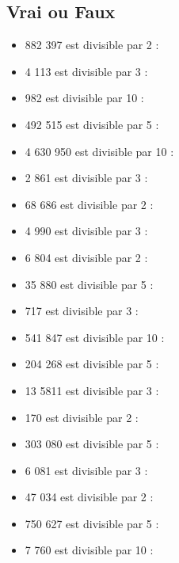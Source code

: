       \subsection*{Vrai ou Faux}
      \begin{multicols}{2}
      \begin{itemize}
        \item 882 397 est divisible par 2 : \dotfill \\
        \item 4 113 est divisible par 3 : \dotfill \\
        \item 982 est divisible par 10 : \dotfill \\
        \item 492 515 est divisible par 5 : \dotfill \\
        \item 4 630 950 est divisible par 10 : \dotfill \\
        \item 2 861 est divisible par 3 : \dotfill \\
        \item 68 686 est divisible par 2 : \dotfill \\
        \item 4 990 est divisible par 3 : \dotfill \\
        \item 6 804 est divisible par 2 : \dotfill \\
        \item 35 880 est divisible par 5 : \dotfill \\
        \item 717 est divisible par 3 : \dotfill \\
        \item 541 847 est divisible par 10 : \dotfill \\
        \item 204 268 est divisible par 5 : \dotfill \\
        \item 13 5811 est divisible par 3 : \dotfill \\
        \item 170 est divisible par 2 : \dotfill \\
        \item 303 080 est divisible par 5 : \dotfill \\
        \item 6 081 est divisible par 3 : \dotfill \\
        \item 47 034 est divisible par 2 : \dotfill \\
        \item 750 627 est divisible par 5 : \dotfill \\
        \item 7 760 est divisible par 10 : \dotfill \\
      \end{itemize}
    \end{multicols}

